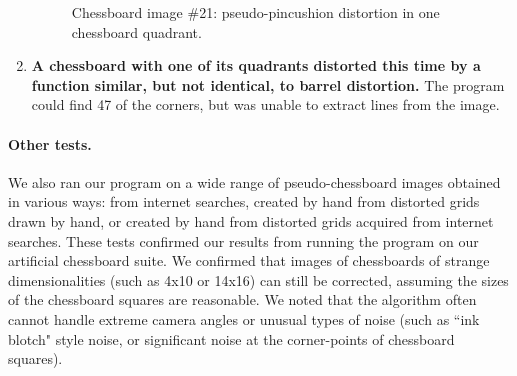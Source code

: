 \begin{enumerate}
\begin{figure}[H]
  \centering
  \caption{Chessboard image \#21: pseudo-pincushion distortion in one chessboard quadrant.}
  \label{fig:chess-21}
\end{figure}
  \item \textbf{A chessboard with one of its quadrants distorted this time by a function similar, but not identical, to barrel distortion.} The program could find 47 of the corners, but was unable to extract lines from the image.
\end{enumerate}

\paragraph{Other tests.}
We also ran our program on a wide range of pseudo-chessboard images obtained in various ways: from internet searches, created by hand from distorted grids drawn by hand, or created by hand from distorted grids acquired from internet searches. These tests confirmed our results from running the program on our artificial chessboard suite. We confirmed that images of chessboards of strange dimensionalities (such as 4x10 or 14x16) can still be corrected, assuming the sizes of the chessboard squares are reasonable. We noted that the algorithm often cannot handle extreme camera angles or unusual types of noise (such as ``ink blotch" style noise, or significant noise at the corner-points of chessboard squares).


